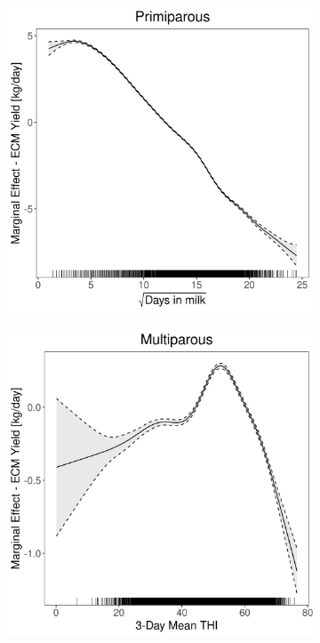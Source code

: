 \begin{figure}[H]
\begin{subfigure}[b]{0.45\textwidth}
    \end{subfigure}
    \hspace{0.05\textwidth} %
    \begin{subfigure}[b]{0.45\textwidth}
        \centering
        \includegraphics[width=\textwidth]{thesis/figures/models/ecm/full/sf_ecm_full/sf_ecm_full_marginal_dim_milk_primi.png}
    \end{subfigure}
    \begin{subfigure}[b]{0.45\textwidth}
        \centering
        \includegraphics[width=\textwidth]{thesis/figures/models/ecm/full/sf_ecm_full/sf_ecm_full_marginal_thi_milk_multi.png}

\end{subfigure}
\end{figure}
